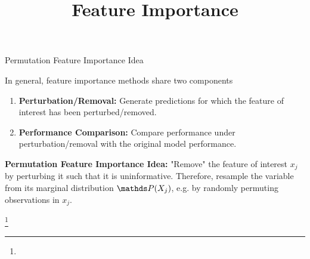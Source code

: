 \documentclass[11pt,compress,t,notes=noshow, xcolor=table]{beamer}
\title{Feature Importance}
\institute{\href{https://compstat-lmu.github.io/lecture_i2ml/}{compstat-lmu.github.io/lecture\_i2ml}}
\date{}
\begin{document}
	
	
	
	
	
	
	
	
	
	

\begin{vbframe}{Permutation Feature Importance Idea}

In general, feature importance methods share two components
\lz
\begin{enumerate}
  \item \textbf{Perturbation/Removal:} Generate predictions for which the feature of interest has been perturbed/removed.
  \item \textbf{Performance Comparison:} Compare performance under perturbation/removal with the original model performance.
\end{enumerate}
\lz
\textbf{Permutation Feature Importance Idea:} "Remove" the feature of interest $x_j$ by perturbing it such that it is uninformative. Therefore, resample the variable from its marginal distribution $\P(X_j)$, e.g. by randomly permuting observations in $x_j$.

\footnote[frame]{}




\end{vbframe}
\end{document}
